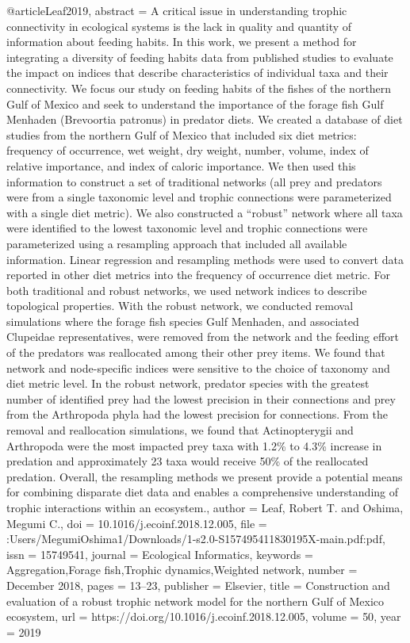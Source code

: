 @article{Leaf2019,
abstract = {A critical issue in understanding trophic connectivity in ecological systems is the lack in quality and quantity of information about feeding habits. In this work, we present a method for integrating a diversity of feeding habits data from published studies to evaluate the impact on indices that describe characteristics of individual taxa and their connectivity. We focus our study on feeding habits of the fishes of the northern Gulf of Mexico and seek to understand the importance of the forage fish Gulf Menhaden (Brevoortia patronus) in predator diets. We created a database of diet studies from the northern Gulf of Mexico that included six diet metrics: frequency of occurrence, wet weight, dry weight, number, volume, index of relative importance, and index of caloric importance. We then used this information to construct a set of traditional networks (all prey and predators were from a single taxonomic level and trophic connections were parameterized with a single diet metric). We also constructed a “robust” network where all taxa were identified to the lowest taxonomic level and trophic connections were parameterized using a resampling approach that included all available information. Linear regression and resampling methods were used to convert data reported in other diet metrics into the frequency of occurrence diet metric. For both traditional and robust networks, we used network indices to describe topological properties. With the robust network, we conducted removal simulations where the forage fish species Gulf Menhaden, and associated Clupeidae representatives, were removed from the network and the feeding effort of the predators was reallocated among their other prey items. We found that network and node-specific indices were sensitive to the choice of taxonomy and diet metric level. In the robust network, predator species with the greatest number of identified prey had the lowest precision in their connections and prey from the Arthropoda phyla had the lowest precision for connections. From the removal and reallocation simulations, we found that Actinopterygii and Arthropoda were the most impacted prey taxa with 1.2{\%} to 4.3{\%} increase in predation and approximately 23 taxa would receive 50{\%} of the reallocated predation. Overall, the resampling methods we present provide a potential means for combining disparate diet data and enables a comprehensive understanding of trophic interactions within an ecosystem.},
author = {Leaf, Robert T. and Oshima, Megumi C.},
doi = {10.1016/j.ecoinf.2018.12.005},
file = {:Users/MegumiOshima1/Downloads/1-s2.0-S157495411830195X-main.pdf:pdf},
issn = {15749541},
journal = {Ecological Informatics},
keywords = {Aggregation,Forage fish,Trophic dynamics,Weighted network},
number = {December 2018},
pages = {13--23},
publisher = {Elsevier},
title = {{Construction and evaluation of a robust trophic network model for the northern Gulf of Mexico ecosystem}},
url = {https://doi.org/10.1016/j.ecoinf.2018.12.005},
volume = {50},
year = {2019}
}
